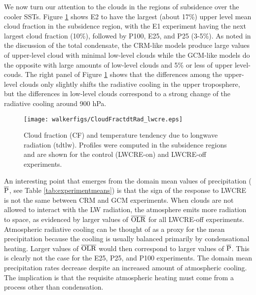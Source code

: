 \documentclass[draft]{agujournal2019}
\begin{document}
{%

We now turn our attention to the clouds in the regions of subsidence over the cooler SSTs.
Figure \ref{fig:cf_tdtlw} shows E2 to have the largest (about 17\%) upper level mean cloud
fraction in the subsidence region, with the E1 experiment having the next largest cloud fraction (10\%), followed by 
P100, E25, and P25 (3-5\%).  As noted in the discussion of the total condensate, the CRM-like models 
produce large values of upper-level cloud with minimal low-level clouds while the GCM-like models
do the opposite with large amounts of low-level clouds and 5\% or less of upper level-couds.   
The right panel of Figure \ref{fig:cf_tdtlw} shows that the differences among the upper-level clouds only slightly shifts the radiative cooling in the
upper troposphere, but the differences in low-level clouds correspond to a strong change of the radiative cooling around 900 hPa. 

\begin{figure}
  \centering
      \texttt{[image: walkerfigs/CloudFractdtRad\_lwcre.eps]}
  \caption{Cloud fraction (CF) and temperature tendency due to longwave radiation (tdtlw).  Profiles were computed in the 
  subsidence regions and are shown for the control (LWCRE-on) and LWCRE-off experiments.}
  \label{fig:cf_tdtlw}
\end{figure}

An interesting point that emerges from the domain mean values of precipitation ($\overline{\rm{P}}$, see Table \ref{tab:experimentmeans}) 
is that the sign of the response to LWCRE is not the same between CRM and GCM experiments.
When clouds are not allowed to interact with the LW radiation, the atmosphere 
emits more radiation to space, as evidenced by larger values of $\overline{\rm{OLR}}$ 
for all LWCRE-off experiments.  Atmospheric radiative cooling can be thought of 
as a proxy for the mean precipitation because the cooling is usually balanced primarily by 
condensational heating.  Larger values of $\overline{\rm{OLR}}$ would then correspond to 
larger values of $\overline{\rm{P}}$.  This is clearly not the case for the E25, P25, and 
P100 experiments.   The domain mean precipitation rates decrease despite an increased 
amount of atmospheric cooling.  The implication is that the requisite atmospheric heating 
must come from a process other than condensation.  

}
\end{document}
